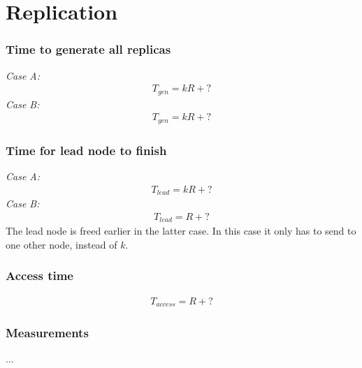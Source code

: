 \section{Replication}

\subsubsection*{Time to generate all replicas}
\textit{Case A:} 
\begin{align}
    T_{gen} = kR + ?
\end{align}
\textit{Case B:} 
\begin{align}
    T_{gen} = kR + ?
\end{align}


\subsubsection*{Time for lead node to finish}
\textit{Case A:}
\begin{align}
    T_{lead} = kR + ?
\end{align}
\textit{Case B:}
\begin{align}
    T_{lead} = R + ?
\end{align}
The lead node is freed earlier in the latter case. In this case it only has to send to one other node, instead of $k$.

\subsubsection*{Access time}
\begin{align}
    T_{access} = R + ?
\end{align}

\subsubsection*{Measurements}
...